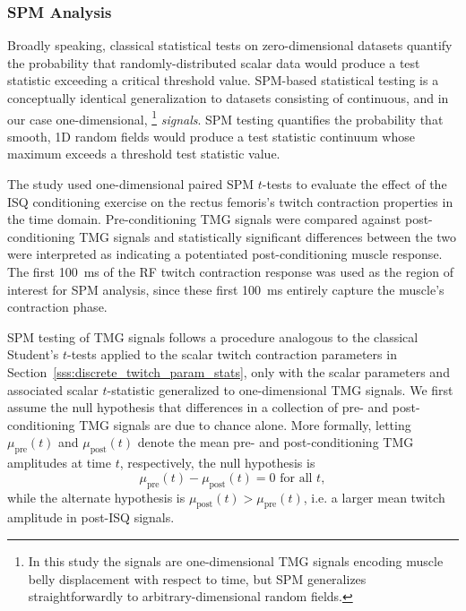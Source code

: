 \documentclass[utf8]{FrontiersinHarvard}
\begin{document}
\subsubsection{SPM Analysis} \label{sss:spm_analysis}
Broadly speaking, classical statistical tests on zero-dimensional datasets quantify the probability that randomly-distributed scalar data would produce a test statistic exceeding a critical threshold value.
SPM-based statistical testing is a conceptually identical generalization to datasets consisting of continuous, and in our case one-dimensional,%
\footnote{In this study the signals are one-dimensional TMG signals encoding muscle belly displacement with respect to time, but SPM generalizes straightforwardly to arbitrary-dimensional random fields.}
\textit{signals}.
SPM testing quantifies the probability that smooth, 1D random fields would produce a test statistic continuum whose maximum exceeds a threshold test statistic value.

The study used one-dimensional paired SPM $ t $-tests to evaluate the effect of the ISQ conditioning exercise on the rectus femoris's twitch contraction properties in the time domain.
Pre-conditioning TMG signals were compared against post-conditioning TMG signals and statistically significant differences between the two were interpreted as indicating a potentiated post-conditioning muscle response.
The first \SI{100}{\milli \second} of the RF twitch contraction response was used as the region of interest for SPM analysis, since these first \SI{100}{\milli \second} entirely capture the muscle's contraction phase.

SPM testing of TMG signals follows a procedure analogous to the classical Student's $ t $-tests applied to the scalar twitch contraction parameters in Section~\ref{sss:discrete_twitch_param_stats}, only with the scalar parameters and associated scalar $ t $-statistic generalized to one-dimensional TMG signals.
We first assume the null hypothesis that differences in a collection of pre- and post-conditioning TMG signals are due to chance alone.
More formally, letting $ \mu_{\mathrm{pre}}(t) $ and $ \mu_{\mathrm{post}}(t) $ denote the mean pre- and post-conditioning TMG amplitudes at time $ t $, respectively, the null hypothesis is
\begin{equation}
    \mu_{\text{pre}}(t) - \mu_{\text{post}} (t) = 0 \text{ for all } t, \label{eq:spm_null_hypothesis}
\end{equation}
while the alternate hypothesis is $ \mu_{\text{post}}(t) > \mu_{\text{pre}}(t) $, i.e. a larger mean twitch amplitude in post-ISQ signals.
\end{document}
